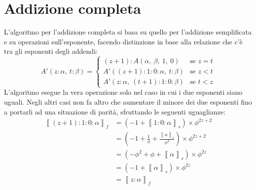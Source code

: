 \documentclass[Lau]{sapthesis}
\begin{document}
\section{Addizione completa}
L'algoritmo per l'addizione completa si basa su quello per l'addizione semplificata e su operazioni sull'esponente, facendo distinzione in base alla relazione che c'è tra gli esponenti degli addendi:
\begin{equation*}
A'(z:\alpha, \ t:\beta) = \begin{cases}
(z+1):A(\alpha, \ \beta, \ 1, \ 0) & \text{se $z=t$}\\
A'((z+1):1:0:\alpha, \ t:\beta) & \text{se $z<t$}\\
A'(z:\alpha, \ (t+1):1:0:\beta) & \text{se $t<z$}
\end{cases}
\end{equation*}
L'algoritmo esegue la vera operazione solo nel caso in cui i due esponenti siano uguali. Negli altri casi non fa altro che aumentare il minore dei due esponenti fino a portarli ad una situazione di parità, sfruttando le seguenti uguaglianze:
\begin{align*}
\left\llbracket (z+1):1:0:\alpha \right\rrbracket_f & = \left( - 1 + \left\llbracket 1:0:\alpha \right\rrbracket_s \right) \times \phi^{2z+2}\\
& = \left( - 1 + \frac{1}{\phi} + \frac{\left\llbracket \alpha \right\rrbracket_s}{\phi^2} \right) \times \phi^{2z+2}\\
& = \left( - \phi^2 + \phi + \left\llbracket \alpha \right\rrbracket_s \right) \times \phi^{2z}\\
& = \left( - 1 + \left\llbracket \alpha \right\rrbracket_s \right) \times \phi^{2z}\\
& = \left\llbracket z:\alpha \right\rrbracket_f
\end{align*}
\end{document}
